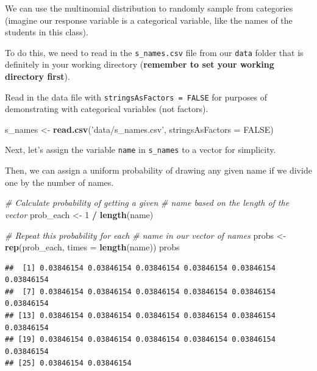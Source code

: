 \documentclass[
]{book}
\newenvironment{Shaded}{\begin{snugshade}}{\end{snugshade}}
\newcommand{\CommentTok}[1]{\textcolor[rgb]{0.56,0.35,0.01}{\textit{#1}}}
\newcommand{\DataTypeTok}[1]{\textcolor[rgb]{0.13,0.29,0.53}{#1}}
\newcommand{\DecValTok}[1]{\textcolor[rgb]{0.00,0.00,0.81}{#1}}
\newcommand{\KeywordTok}[1]{\textcolor[rgb]{0.13,0.29,0.53}{\textbf{#1}}}
\newcommand{\NormalTok}[1]{#1}
\newcommand{\OperatorTok}[1]{\textcolor[rgb]{0.81,0.36,0.00}{\textbf{#1}}}
\newcommand{\OtherTok}[1]{\textcolor[rgb]{0.56,0.35,0.01}{#1}}
\newcommand{\StringTok}[1]{\textcolor[rgb]{0.31,0.60,0.02}{#1}}
\begin{document}
We can use the multinomial distribution to randomly sample from categories (imagine our response variable is a categorical variable, like the names of the students in this class).

To do this, we need to read in the \texttt{s\_names.csv} file from our \texttt{data} folder that is definitely in your working directory (\textbf{remember to set your working directory first}).

Read in the data file with \texttt{stringsAsFactors\ =\ FALSE} for purposes of demonstrating with categorical variables (not factors).

\begin{Shaded}
\begin{Highlighting}[]
\NormalTok{s_names <-}\StringTok{ }\KeywordTok{read.csv}\NormalTok{(}\StringTok{'data/s_names.csv'}\NormalTok{, }\DataTypeTok{stringsAsFactors =} \OtherTok{FALSE}\NormalTok{)}
\end{Highlighting}
\end{Shaded}

Next, let's assign the variable \texttt{name} in \texttt{s\_names} to a vector for simplicity.

\begin{Shaded}
\end{Shaded}

Then, we can assign a uniform probability of drawing any given name if we divide one by the number of names.

\begin{Shaded}
\begin{Highlighting}[]
\CommentTok{# Calculate probability of getting a given }
\CommentTok{# name based on the length of the vector}
\NormalTok{prob_each <-}\StringTok{ }\DecValTok{1} \OperatorTok{/}\StringTok{ }\KeywordTok{length}\NormalTok{(name)}

\CommentTok{# Repeat this probability for each }
\CommentTok{# name in our vector of names}
\NormalTok{probs <-}\StringTok{ }\KeywordTok{rep}\NormalTok{(prob_each, }\DataTypeTok{times =} \KeywordTok{length}\NormalTok{(name))      }
\NormalTok{probs      }
\end{Highlighting}
\end{Shaded}

\begin{verbatim}
##  [1] 0.03846154 0.03846154 0.03846154 0.03846154 0.03846154 0.03846154
##  [7] 0.03846154 0.03846154 0.03846154 0.03846154 0.03846154 0.03846154
## [13] 0.03846154 0.03846154 0.03846154 0.03846154 0.03846154 0.03846154
## [19] 0.03846154 0.03846154 0.03846154 0.03846154 0.03846154 0.03846154
## [25] 0.03846154 0.03846154
\end{verbatim}
\end{document}
